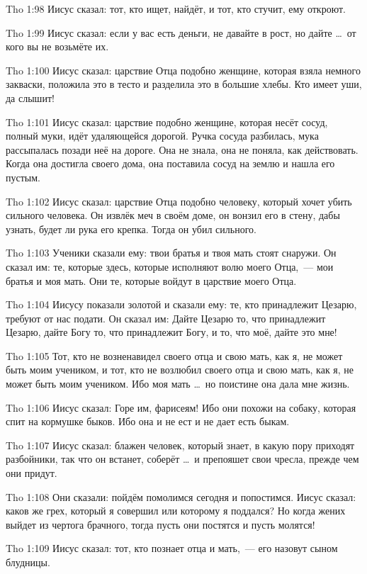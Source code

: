 \vs Tho 1:98
Иисус сказал:
тот, кто ищет, найдёт, и тот, кто стучит, ему откроют.

\vs Tho 1:99
Иисус сказал:
если у вас есть деньги, не давайте в рост,
но дайте \ldots\ от кого вы не возьмёте их.

\vs Tho 1:100
Иисус сказал:
царствие Отца подобно женщине, которая взяла немного закваски,
положила это в тесто и разделила это в большие хлебы.
Кто имеет уши, да слышит!

\vs Tho 1:101
Иисус сказал:
царствие подобно женщине, которая несёт сосуд,
полный муки, идёт удаляющейся дорогой.
Ручка сосуда разбилась, мука рассыпалась позади неё на дороге.
Она не знала, она не поняла, как действовать.
Когда она достигла своего дома,
она поставила сосуд на землю и нашла его пустым.

\vs Tho 1:102
Иисус сказал:
царствие Отца подобно человеку,
который хочет убить сильного человека.
Он извлёк меч в своём доме, он вонзил его в стену,
дабы узнать, будет ли рука его крепка.
Тогда он убил сильного.

\vs Tho 1:103
Ученики сказали ему:
твои братья и твоя мать стоят снаружи.
Он сказал им:
те, которые здесь,
которые исполняют волю моего Отца,~--- мои братья и моя мать.
Они те, которые войдут в царствие моего Отца.

\vs Tho 1:104
Иисусу показали золотой и сказали ему:
те, кто принадлежит Цезарю, требуют от нас подати.
Он сказал им: Дайте Цезарю то, что принадлежит Цезарю,
дайте Богу то, что принадлежит Богу,
и то, что моё, дайте это мне!

\vs Tho 1:105
Тот, кто не возненавидел своего отца и свою мать,
как я, не может быть моим учеником,
и тот, кто не возлюбил своего отца и свою мать,
как я, не может быть моим учеником.
Ибо моя мать \ldots\ но поистине она дала мне жизнь.

\vs Tho 1:106
Иисус сказал: Горе им, фарисеям! Ибо они похожи на собаку,
которая спит на кормушке быков. Ибо она и не ест и не дает есть быкам.

\vs Tho 1:107
Иисус сказал:
блажен человек, который знает, в какую пору приходят разбойники,
так что он встанет, соберёт \ldots\ и препояшет свои чресла,
прежде чем они придут.

\vs Tho 1:108
Они сказали:
пойдём помолимся сегодня и попостимся.
Иисус сказал:
каков же грех, который я совершил или которому я поддался?
Но когда жених выйдет из чертога брачного,
тогда пусть они постятся и пусть молятся!

\vs Tho 1:109
Иисус сказал:
тот, кто познает отца и мать,~--- его назовут сыном блудницы.

